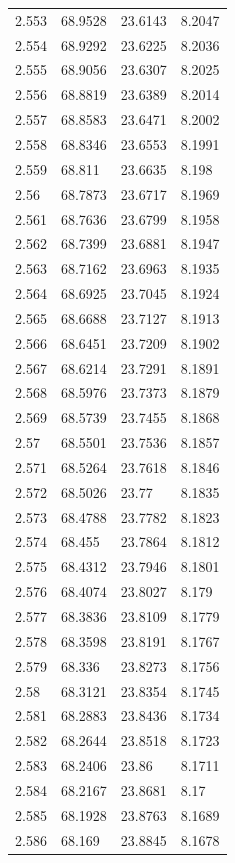 \begin{tabular}{llll}
2.553 & 68.9528 & 23.6143 & 8.2047 \\
2.554 & 68.9292 & 23.6225 & 8.2036 \\
2.555 & 68.9056 & 23.6307 & 8.2025 \\
2.556 & 68.8819 & 23.6389 & 8.2014 \\
2.557 & 68.8583 & 23.6471 & 8.2002 \\
2.558 & 68.8346 & 23.6553 & 8.1991 \\
2.559 & 68.811 & 23.6635 & 8.198 \\
2.56 & 68.7873 & 23.6717 & 8.1969 \\
2.561 & 68.7636 & 23.6799 & 8.1958 \\
2.562 & 68.7399 & 23.6881 & 8.1947 \\
2.563 & 68.7162 & 23.6963 & 8.1935 \\
2.564 & 68.6925 & 23.7045 & 8.1924 \\
2.565 & 68.6688 & 23.7127 & 8.1913 \\
2.566 & 68.6451 & 23.7209 & 8.1902 \\
2.567 & 68.6214 & 23.7291 & 8.1891 \\
2.568 & 68.5976 & 23.7373 & 8.1879 \\
2.569 & 68.5739 & 23.7455 & 8.1868 \\
2.57 & 68.5501 & 23.7536 & 8.1857 \\
2.571 & 68.5264 & 23.7618 & 8.1846 \\
2.572 & 68.5026 & 23.77 & 8.1835 \\
2.573 & 68.4788 & 23.7782 & 8.1823 \\
2.574 & 68.455 & 23.7864 & 8.1812 \\
2.575 & 68.4312 & 23.7946 & 8.1801 \\
2.576 & 68.4074 & 23.8027 & 8.179 \\
2.577 & 68.3836 & 23.8109 & 8.1779 \\
2.578 & 68.3598 & 23.8191 & 8.1767 \\
2.579 & 68.336 & 23.8273 & 8.1756 \\
2.58 & 68.3121 & 23.8354 & 8.1745 \\
2.581 & 68.2883 & 23.8436 & 8.1734 \\
2.582 & 68.2644 & 23.8518 & 8.1723 \\
2.583 & 68.2406 & 23.86 & 8.1711 \\
2.584 & 68.2167 & 23.8681 & 8.17 \\
2.585 & 68.1928 & 23.8763 & 8.1689 \\
2.586 & 68.169 & 23.8845 & 8.1678 \\

\end{tabular}
